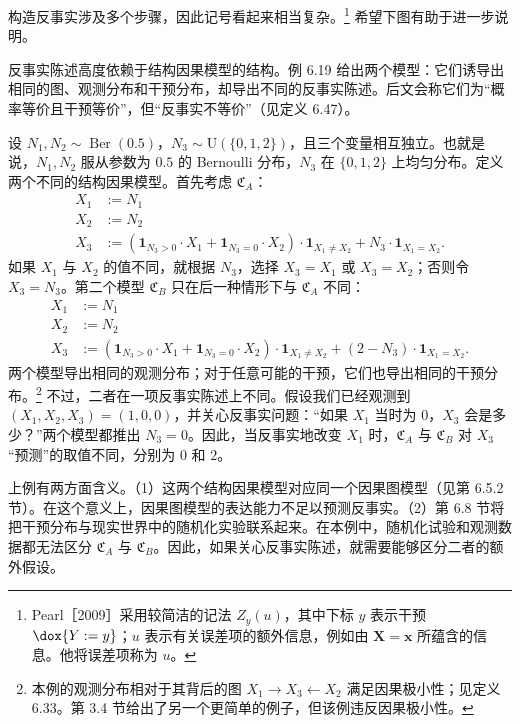 构造反事实涉及多个步骤，因此记号看起来相当复杂。\footnote{Pearl［2009］采用较简洁的记法 $Z_y(u)$，其中下标 $y$ 表示干预 $\dox{Y:=y}$；$u$ 表示有关误差项的额外信息，例如由 $\mathbf X=\mathbf x$ 所蕴含的信息。他将误差项称为 $u$。}
希望下图有助于进一步说明。


反事实陈述高度依赖于结构因果模型的结构。例 6.19 给出两个模型：它们诱导出相同的图、观测分布和干预分布，却导出不同的反事实陈述。后文会称它们为“概率等价且干预等价”，但“反事实不等价”（见定义 6.47）。

\begin{example}
设 $N_1,N_2\sim\operatorname{Ber}(0.5)$，$N_3\sim\mathrm U(\{0,1,2\})$，且三个变量相互独立。也就是说，$N_1,N_2$ 服从参数为 $0.5$ 的 Bernoulli 分布，$N_3$ 在 $\{0,1,2\}$ 上均匀分布。定义两个不同的结构因果模型。首先考虑 $\mathfrak C_A$：
\[
 \begin{aligned}
 X_1&:=N_1\\
 X_2&:=N_2\\
 X_3&:=(\mathbf1_{N_3>0}\cdot X_1+\mathbf1_{N_3=0}\cdot X_2)
 \cdot\mathbf1_{X_1\ne X_2}+N_3\cdot\mathbf1_{X_1=X_2}.
 \end{aligned}
\]
如果 $X_1$ 与 $X_2$ 的值不同，就根据 $N_3$，选择 $X_3=X_1$ 或 $X_3=X_2$；否则令 $X_3=N_3$。第二个模型 $\mathfrak C_B$ 只在后一种情形下与 $\mathfrak C_A$ 不同：
\[
 \begin{aligned}
 X_1&:=N_1\\
 X_2&:=N_2\\
 X_3&:=(\mathbf1_{N_3>0}\cdot X_1+\mathbf1_{N_3=0}\cdot X_2)
 \cdot\mathbf1_{X_1\ne X_2}+(2-N_3)\cdot\mathbf1_{X_1=X_2}.
 \end{aligned}
\]
两个模型导出相同的观测分布；对于任意可能的干预，它们也导出相同的干预分布。\footnote{本例的观测分布相对于其背后的图 $X_1\to X_3\leftarrow X_2$ 满足因果极小性；见定义 6.33。第 3.4 节给出了另一个更简单的例子，但该例违反因果极小性。}
不过，二者在一项反事实陈述上不同。假设我们已经观测到 $(X_1,X_2,X_3)=(1,0,0)$，并关心反事实问题：“如果 $X_1$ 当时为 $0$，$X_3$ 会是多少？”两个模型都推出 $N_3=0$。因此，当反事实地改变 $X_1$ 时，$\mathfrak C_A$ 与 $\mathfrak C_B$ 对 $X_3$“预测”的取值不同，分别为 $0$ 和 $2$。
\end{example}

上例有两方面含义。（1）这两个结构因果模型对应同一个因果图模型（见第 6.5.2 节）。在这个意义上，因果图模型的表达能力不足以预测反事实。（2）第 6.8 节将把干预分布与现实世界中的随机化实验联系起来。在本例中，随机化试验和观测数据都无法区分 $\mathfrak C_A$ 与 $\mathfrak C_B$。因此，如果关心反事实陈述，就需要能够区分二者的额外假设。

